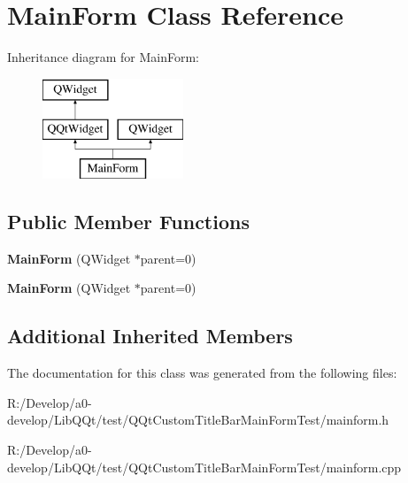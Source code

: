\hypertarget{class_main_form}{}\section{Main\+Form Class Reference}
\label{class_main_form}
Inheritance diagram for Main\+Form\+:\begin{figure}[H]
\begin{center}
\leavevmode
\includegraphics[height=3.000000cm]{class_main_form}
\end{center}
\end{figure}
\subsection*{Public Member Functions}
\begin{DoxyCompactItemize}
\item 
\mbox{\label{class_main_form_a8407ed1ab0a7b7bef115711157c8f344}} 
{\bfseries Main\+Form} (Q\+Widget $\ast$parent=0)
\item 
\mbox{\label{class_main_form_a8407ed1ab0a7b7bef115711157c8f344}} 
{\bfseries Main\+Form} (Q\+Widget $\ast$parent=0)
\end{DoxyCompactItemize}
\subsection*{Additional Inherited Members}


The documentation for this class was generated from the following files\+:\begin{DoxyCompactItemize}
\item 
R\+:/\+Develop/a0-\/develop/\+Lib\+Q\+Qt/test/\+Q\+Qt\+Custom\+Title\+Bar\+Main\+Form\+Test/mainform.\+h\item 
R\+:/\+Develop/a0-\/develop/\+Lib\+Q\+Qt/test/\+Q\+Qt\+Custom\+Title\+Bar\+Main\+Form\+Test/mainform.\+cpp\end{DoxyCompactItemize}
